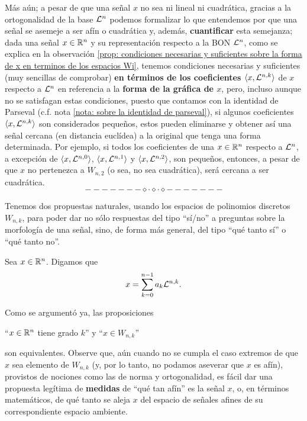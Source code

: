 Más aún; a pesar de que
una señal $x$ no sea ni lineal ni cuadrática, gracias a la 
ortogonalidad de la base
$\mathcal{L}^{n}$ podemos formalizar lo que
entendemos por que una señal se asemeje a ser
afín o cuadrática y, además, \textbf{cuantificar} esta semejanza;
dada una señal $x \in \mathbb{R}^{n}$ y
su representación respecto a la BON $\mathcal{L}^{n}$,
como se explica en la observación 
\ref{prop: condiciones necesarias y suficientes sobre la forma de x en terminos de los espacios Wi}, tenemos condiciones necesarias y suficientes
(muy sencillas de comprobar)
\textbf{en términos de los coeficientes $\langle x , \mathcal{L}^{n,k} \rangle$}
de $x$ respecto a $\mathcal{L}^{n}$ 
en referencia a la \textbf{forma
de la gráfica de $x$}, pero, incluso aunque no se satisfagan
estas condiciones,
puesto que contamos con la identidad de Parseval
(c.f. nota \ref{nota: sobre la identidad de parseval}),
si
algunos coeficientes $\langle x , \mathcal{L}^{n,k} \rangle$ son considerados pequeños, estos
pueden eliminarse y obtener así una señal cercana (en distancia
euclídea) a la original que tenga una forma determinada.
Por ejemplo, si todos los coeficientes de una 
$x \in \mathbb{R}^{n}$ respecto a $\mathcal{L}^{n}$, a excepción de 
$\langle x , \mathcal{L}^{n,0} \rangle$,
$\langle x , \mathcal{L}^{n,1} \rangle$ y
$\langle x , \mathcal{L}^{n,2} \rangle$,
son pequeños, entonces, a pesar de que
$x$ no pertenezca a $W_{n,2}$ (o sea, no sea cuadrática),
será cercana a ser cuadrática. \\

\[
------- \diamond \cdot \diamond \cdot \diamond -------
\]

Tenemos
dos propuestas naturales,
usando los espacios de polinomios discretos $W_{n,k}$,
para poder dar no sólo respuestas del tipo
``sí/no'' a preguntas sobre la morfología de una señal, sino,
de forma más general, del tipo ``qué tanto sí'' o
``qué tanto no''.

Sea $x \in \mathbb{R}^{n}$. Digamos que 
\[
x = \sum\limits_{k=0}^{n-1}a_{k} \mathcal{L}^{n, k}.
\]


Como se argumentó ya, las proposiciones
\begin{center}
``$x \in \mathbb{R}^{n}$ tiene grado $k$'' \hspace{0.2cm} y \hspace{0.2cm} 
``$x \in W_{n,k}$''
\end{center} 
son equivalentes.
Observe que, aún cuando no se cumpla el caso
extremos de que $x$ sea elemento 
de $W_{n,k}$ (y, por lo tanto, no podamos aseverar que
$x$ es afín), provistos
de nociones como las de norma y ortogonalidad, es fácil dar 
una propuesta legítima de
\textbf{medidas} de ``qué tan afín'' es la señal $x$,
o, en términos matemáticos, de qué tanto se aleja
$x$ del espacio de señales afines de su correspondiente
espacio ambiente.

